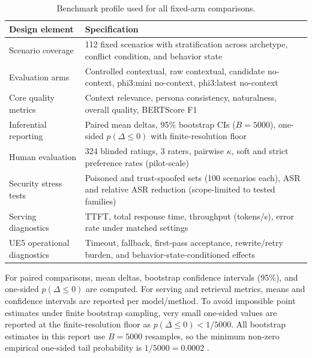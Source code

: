 ﻿\documentclass[a4paper,12pt]{article}
\newcommand{\BootstrapSamples}{5000}
\begin{document}
\begin{table}[t]
\centering
\caption{Benchmark profile used for all fixed-arm comparisons.}
\label{tab:benchmark_profile}
\begingroup
\normalsize
\setlength{\tabcolsep}{6pt}
\renewcommand{\arraystretch}{1.25}
\begin{tabular}{p{}p{}}
\toprule
Design element & Specification \\
\midrule
Scenario coverage & 112 fixed scenarios with stratification across archetype, conflict condition, and behavior state \\
Evaluation arms & Controlled contextual, raw contextual, candidate no-context, phi3:mini no-context, phi3:latest no-context \\
Core quality metrics & Context relevance, persona consistency, naturalness, overall quality, BERTScore F1 \\
Inferential reporting & Paired mean deltas, 95\% bootstrap CIs (\(B=\BootstrapSamples\)), one-sided \(p(\Delta\le0)\) with finite-resolution floor \\
Human evaluation & 324 blinded ratings, 3 raters, pairwise \(\kappa\), soft and strict preference rates (pilot-scale) \\
Security stress tests & Poisoned and trust-spoofed sets (100 scenarios each), ASR and relative ASR reduction (scope-limited to tested families) \\
Serving diagnostics & TTFT, total response time, throughput (tokens/s), error rate under matched settings \\
UE5 operational diagnostics & Timeout, fallback, first-pass acceptance, rewrite/retry burden, and behavior-state-conditioned effects \\
\bottomrule
\end{tabular}
\endgroup
\end{table}

For paired comparisons, mean deltas, bootstrap confidence intervals (95\%), and one-sided \(p(\Delta\le 0)\) are computed. For serving and retrieval metrics, means and confidence intervals are reported per model/method. To avoid impossible point estimates under finite bootstrap sampling, very small one-sided values are reported at the finite-resolution floor as \(p(\Delta\le0)<1/\BootstrapSamples\). All bootstrap estimates in this report use \(B=\BootstrapSamples\) resamples, so the minimum non-zero empirical one-sided tail probability is \(1/\BootstrapSamples=0.0002\) \cite{Efron1979Bootstrap}.
\end{document}

